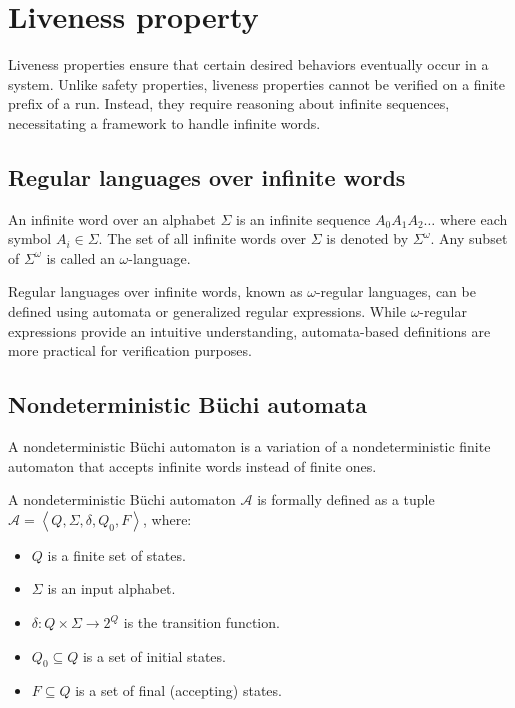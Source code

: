 \section{Liveness property}

Liveness properties ensure that certain desired behaviors eventually occur in a system. 
Unlike safety properties, liveness properties cannot be verified on a finite prefix of a run. 
Instead, they require reasoning about infinite sequences, necessitating a framework to handle infinite words. 

\subsection{Regular languages over infinite words}
An infinite word over an alphabet $\Sigma$ is an infinite sequence $A_0A_1A_2\dots$ where each symbol $A_i\in\Sigma$. 
The set of all infinite words over $\Sigma$ is denoted by $\Sigma^\omega$. 
Any subset of $\Sigma^\omega$ is called an $\omega$-language.

Regular languages over infinite words, known as $\omega$-regular languages, can be defined using automata or generalized regular expressions. 
While $\omega$-regular expressions provide an intuitive understanding, automata-based definitions are more practical for verification purposes.

\subsection{Nondeterministic Büchi automata}
A nondeterministic Büchi automaton is a variation of a nondeterministic finite automaton that accepts infinite words instead of finite ones.
\begin{definition}
    A nondeterministic Büchi automaton $\mathcal{A}$ is formally defined as a tuple $\mathcal{A} = \left\langle Q, \Sigma, \delta, Q_0, F\right\rangle$, where: 
    \begin{itemize}
        \item $Q$ is a finite set of states.
        \item $\Sigma$ is an input alphabet.
        \item $\delta : Q \times \Sigma \rightarrow 2^Q$ is the transition function.
        \item $Q_0 \subseteq Q$ is a set of initial states.
        \item $F \subseteq Q$ is a set of final (accepting) states.
    \end{itemize}
\end{definition}

